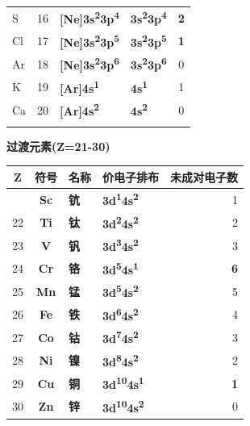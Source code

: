 \documentclass[a4paper,11pt]{ctexart}
\newcounter{none}
\newcommand{\箭}{\ensuremath{\rightarrow}}
\newcommand{\左箭}{\ensuremath{\leftarrow}}
\newcommand{\上箭}{\ensuremath{\uparrow}}
\newcommand{\下箭}{\ensuremath{\downarrow}}
\newcommand{\衡}{\ensuremath{\rightleftharpoons}}
\newcommand{\双箭}{\ensuremath{\leftrightarrow}}
\newcommand{\约等于}{\ensuremath{\approx}}
\newcommand{\小于等于}{\ensuremath{\leq}}
\newcommand{\大于等于}{\ensuremath{\geq}}
\newcommand{\不等于}{\ensuremath{\neq}}
\newcommand{\西格马}{\ensuremath{\sigma}}
\newcommand{\派}{\ensuremath{\pi}}
\begin{document}
{\begin{longtable}[]{@{}lcllc@{}}
S & 16 & \textbf{{[}Ne{]}3s\textsuperscript{2}3p\textsuperscript{4}} & \textbf{3s\textsuperscript{2}3p\textsuperscript{4}} & \textbf{2} \\
Cl & 17 & \textbf{{[}Ne{]}3s\textsuperscript{2}3p\textsuperscript{5}} & \textbf{3s\textsuperscript{2}3p\textsuperscript{5}} & \textbf{1} \\
Ar & 18 & \textbf{{[}Ne{]}3s\textsuperscript{2}3p\textsuperscript{6}} & \textbf{3s\textsuperscript{2}3p\textsuperscript{6}} & 0 \\
K & 19 & \textbf{{[}Ar{]}4s\textsuperscript{1}} & \textbf{4s\textsuperscript{1}} & 1 \\
Ca & 20 & \textbf{{[}Ar{]}4s\textsuperscript{2}} & \textbf{4s\textsuperscript{2}} & 0 \\
& & & & \\
\end{longtable}
}

\textbf{过渡元素(Z=21-30)}

{\def\LTcaptype{none} %
\begin{longtable}[]{@{}ccllr@{}}
\toprule\noalign{}
Z & 符号 & 名称 & 价电子排布 & 未成对电子数 \\
\midrule\noalign{}
\endhead
\bottomrule\noalign{}
\endlastfoot
21 & \textbf{Sc} & \textbf{钪} & \textbf{3d\textsuperscript{1}4s\textsuperscript{2}} & 1 \\
22 & \textbf{Ti} & \textbf{钛} & \textbf{3d\textsuperscript{2}4s\textsuperscript{2}} & 2 \\
23 & \textbf{V} & \textbf{钒} & \textbf{3d\textsuperscript{3}4s\textsuperscript{2}} & 3 \\
24 & \textbf{Cr} & \textbf{铬} & \textbf{3d\textsuperscript{5}4s\textsuperscript{1}} & \textbf{6} \\
25 & \textbf{Mn} & \textbf{锰} & \textbf{3d\textsuperscript{5}4s\textsuperscript{2}} & 5 \\
26 & \textbf{Fe} & \textbf{铁} & \textbf{3d\textsuperscript{6}4s\textsuperscript{2}} & 4 \\
27 & \textbf{Co} & \textbf{钴} & \textbf{3d\textsuperscript{7}4s\textsuperscript{2}} & 3 \\
28 & \textbf{Ni} & \textbf{镍} & \textbf{3d\textsuperscript{8}4s\textsuperscript{2}} & 2 \\
29 & \textbf{Cu} & \textbf{铜} & \textbf{3d\textsuperscript{10}4s\textsuperscript{1}} & \textbf{1} \\
30 & \textbf{Zn} & \textbf{锌} & \textbf{3d\textsuperscript{10}4s\textsuperscript{2}} & 0 \\
\end{longtable}
}
\end{document}
